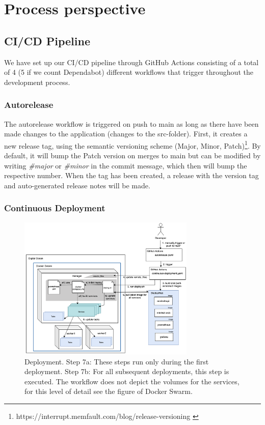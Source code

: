 \newpage
\section{Process perspective}
\subsection{CI/CD Pipeline}
We have set up our CI/CD pipeline through GitHub Actions consisting of a total of 4 (5 if we count Dependabot) different workflows that trigger throughout the development process. 

\subsubsection*{Autorelease} \label{sec:autorelease}
The autorelease workflow is triggered on push to main as long as there have been made changes to the application (changes to the src-folder). First, it creates a new release tag, using the semantic versioning scheme (Major, Minor, Patch)\footnote{https://interrupt.memfault.com/blog/release-versioning \cite{semanticVersioning}}. By default, it will bump the Patch version on merges to main but can be modified by writing \textit{\#major} or \textit{\#minor} in the commit message, which then will bump the respective number. When the tag has been created, a release with the version tag and auto-generated release notes will be made.

\subsubsection*{Continuous Deployment}

\begin{figure}[H]
  \centering
  \includegraphics[width=0.75\textwidth]{Images/deployment.png}
  \caption{Deployment. Step 7a: These steps run only during the first deployment. Step 7b: For all subsequent deployments, this step is executed. The workflow does not depict the volumes for the services, for this level of detail see the figure of Docker Swarm.}
  \label{fig:dashboard}
\end{figure}


